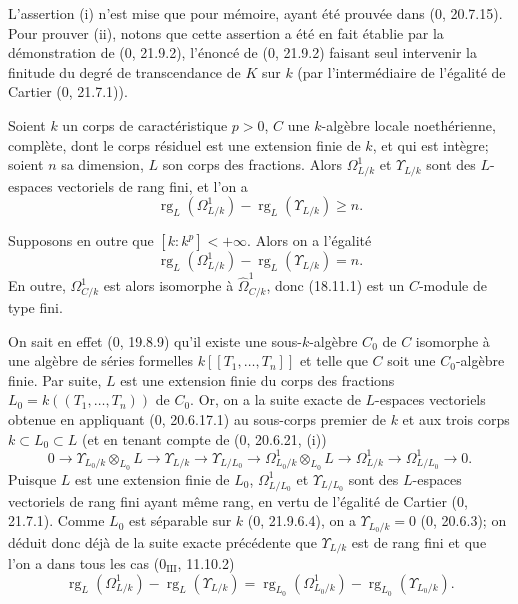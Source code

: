 L'assertion (i) n'est mise que pour mémoire, ayant été prouvée dans (0, 20.7.15). Pour prouver (ii), notons que cette assertion a été en fait établie par la démonstration de (0, 21.9.2), l'énoncé de (0, 21.9.2) faisant seul intervenir la finitude du degré de transcendance de $K$ sur $k$ (par l'intermédiaire de l'égalité de Cartier (0, 21.7.1)).

\begin{lemma}[18.11.2]
\label{IV.18.11.2}
Soient $k$ un corps de caractéristique $p>0$, $C$ une $k$-algèbre locale noethérienne, complète, dont le corps résiduel est une extension finie de $k$, et qui est intègre; soient $n$ sa dimension, $L$ son corps des fractions. Alors $\Omega^1_{L/k}$ et $\Upsilon_{L/k}$ sont des $L$-espaces vectoriels de rang fini, et l'on a
\begin{equation}
\label{IV.18.11.2.1}
\tag{18.11.2.1}
  \operatorname{rg}_L(\Omega^1_{L/k})-\operatorname{rg}_L(\Upsilon_{L/k})\geq n.
\end{equation}


Supposons en outre que $[k:k^p]<+\infty$. Alors on a l'égalité
\begin{equation}
\label{IV.18.11.2.2}
\tag{18.11.2.2}
  \operatorname{rg}_L(\Omega^1_{L/k})-\operatorname{rg}_L(\Upsilon_{L/k})=n.
\end{equation}
En outre, $\Omega^1_{C/k}$ est alors isomorphe à $\hat{\Omega}^1_{C/k}$, donc (18.11.1) est un $C$-module de type fini.
\end{lemma}

On sait en effet (0, 19.8.9) qu'il existe une sous-$k$-algèbre $C_0$ de $C$ isomorphe à une algèbre de séries formelles $k[[T_1,\ldots,T_n]]$ et telle que $C$ soit une $C_0$-algèbre finie. Par suite, $L$ est une extension finie du corps des fractions $L_0=k((T_1,\ldots,T_n))$ de $C_0$. Or, on a la suite exacte de $L$-espaces vectoriels obtenue en appliquant (0, 20.6.17.1) au sous-corps premier de $k$ et aux trois corps $k\subset L_0\subset L$ (et en tenant compte de (0, 20.6.21, (i))
\[
  0\to\Upsilon_{L_0/k}\otimes_{L_0}L\to\Upsilon_{L/k}\to\Upsilon_{L/L_0}
  \to\Omega^1_{L_0/k}\otimes_{L_0}L\to\Omega^1_{L/k}\to\Omega^1_{L/L_0}\to0.
\]
Puisque $L$ est une extension finie de $L_0$, $\Omega^1_{L/L_0}$ et $\Upsilon_{L/L_0}$ sont des $L$-espaces vectoriels de rang fini ayant même rang, en vertu de l'égalité de Cartier (0, 21.7.1). Comme $L_0$ est séparable sur $k$ (0, 21.9.6.4), on a $\Upsilon_{L_0/k}=0$ (0, 20.6.3); on déduit donc déjà de la suite exacte précédente que $\Upsilon_{L/k}$ est de rang fini et que l'on a dans tous les cas ($0_{\mathrm{III}}$, 11.10.2)
\[
  \operatorname{rg}_L(\Omega^1_{L/k})-\operatorname{rg}_L(\Upsilon_{L/k})
  =\operatorname{rg}_{L_0}(\Omega^1_{L_0/k})-\operatorname{rg}_{L_0}(\Upsilon_{L_0/k}).
\]

